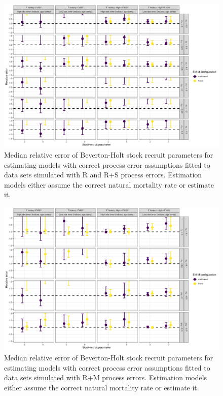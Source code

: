 \documentclass[
  12pt,
]{article}
\begin{document}
\begin{landscape}
\begin{figure}
\caption{Median relative error of Beverton-Holt stock recruit parameters for estimating models with correct process error assumptions fitted to data sets simulated with R and R+S process errors. Estimation models either assume the correct natural mortality rate or estimate it.}\label{naa_om_SR_relbias}
\begin{center}
\includegraphics[width = \textwidth]{naa_om_SR_relerror.png}
\end{center}
\end{figure}
\end{landscape}

\begin{landscape}
\begin{figure}
\caption{Median relative error of Beverton-Holt stock recruit parameters for estimating models with correct process error assumptions fitted to data sets simulated with R+M process errors. Estimation models either assume the correct natural mortality rate or estimate it.}\label{M_om_SR_relbias}
\begin{center}
\includegraphics[width = \textwidth]{M_om_SR_relerror.png}
\end{center}
\end{figure}
\end{landscape}
\end{document}
